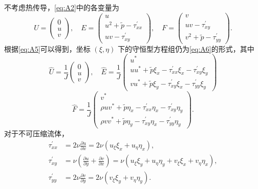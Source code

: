\documentclass[12pt]{article}
\begin{document}
不考虑热传导，\cref{eq:A2}中的各变量为
\begin{equation}
	U=\begin{pmatrix}
		0 \\
		u \\
		v
	\end{pmatrix}, \quad E=\begin{pmatrix}
		u                                   \\
		u^{2}+\tilde{p}-\tau_{x x}^{\prime} \\
		u v-\tau_{x y}^{\prime}
	\end{pmatrix},\quad
	F=\begin{pmatrix}
		v                       \\
		u v-\tau_{x y}^{\prime} \\
		v^{2}+\tilde{p}-\tau_{y y}^{\prime}
	\end{pmatrix}.
\end{equation}
根据\cref{eq:A5}可以得到，坐标 $(\xi, \eta)$ 下的守恒型方程组仍为\cref{eq:A6}的形式，其中
\begin{equation}
	\hat{U}=\frac{1}{J}\begin{pmatrix}
		0 \\
		u \\
		v
	\end{pmatrix},\quad
	\hat{E}=\frac{1}{J}\begin{pmatrix}
		u^{*}                                                                             \\
		u u^{*}+\tilde{p} \xi_{x}-\tau_{x x}^{\prime} \xi_{x}-\tau_{x y}^{\prime} \xi_{y} \\
		v u^{*}+\tilde{p} \xi_{y}-\tau_{x y}^{\prime} \xi_{x}-\tau_{y y}^{\prime} \xi_{y}
	\end{pmatrix}
\end{equation}
\begin{equation}
	\hat{F}=\frac{1}{J}\begin{pmatrix}
		v^{*}                                                                                     \\
		\rho u v^{*}+\tilde{p} \eta_{x}-\tau_{x x}^{\prime} \eta_{x}-\tau_{x y}^{\prime} \eta_{y} \\
		\rho v v^{*}+\tilde{p} \eta_{y}-\tau_{x y}^{\prime} \eta_{x}-\tau_{y y}^{\prime} \eta_{y}
	\end{pmatrix}.
\end{equation}
对于不可压缩流体，
\begin{equation}
	\begin{aligned}
		\tau_{x x}^{\prime} & =2 \nu \frac{\partial u}{\partial x}=2 \nu\left(u_{\xi} \xi_{x}+u_{\eta} \eta_{x}\right),                                                                         \\
		\tau_{x y}^{\prime} & =\nu\left(\frac{\partial u}{\partial y}+\frac{\partial v}{\partial x}\right)=\nu\left(u_{\xi} \xi_{y}+u_{\eta} \eta_{y}+v_{\xi} \xi_{x}+v_{\eta} \eta_{x}\right), \\
		\tau_{y y}^{\prime} & =2 \nu \frac{\partial v}{\partial y}=2 \nu\left(v_{\xi} \xi_{y}+v_{\eta} \eta_{y}\right).
	\end{aligned}
\end{equation}
\end{document}
